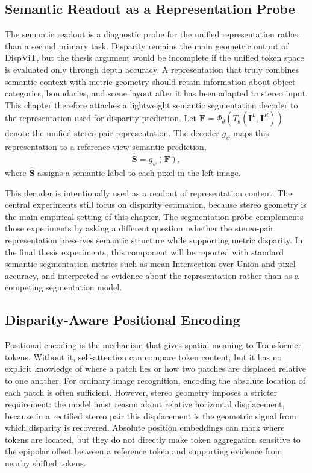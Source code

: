 \subsection{Semantic Readout as a Representation Probe}
\label{sec:dispvit_semantic_readout}
The semantic readout is a diagnostic probe for the unified representation rather than a second primary task.
Disparity remains the main geometric output of DispViT, but the thesis argument would be incomplete if the unified token space is evaluated only through depth accuracy.
A representation that truly combines semantic context with metric geometry should retain information about object categories, boundaries, and scene layout after it has been adapted to stereo input.
This chapter therefore attaches a lightweight semantic segmentation decoder to the representation used for disparity prediction.
Let $\bm{F}=\Phi_{\theta}(T_{\theta}(\bm{I}^L,\bm{I}^R))$ denote the unified stereo-pair representation.
The decoder $g_{\psi}$ maps this representation to a reference-view semantic prediction,
\begin{equation}
    \hat{\bm{S}} = g_{\psi}(\bm{F}),
    \label{eq:dispvit_semantic_readout}
\end{equation}
where $\hat{\bm{S}}$ assigns a semantic label to each pixel in the left image.

This decoder is intentionally used as a readout of representation content.
The central experiments still focus on disparity estimation, because stereo geometry is the main empirical setting of this chapter.
The segmentation probe complements those experiments by asking a different question: whether the stereo-pair representation preserves semantic structure while supporting metric disparity.
In the final thesis experiments, this component will be reported with standard semantic segmentation metrics such as mean Intersection-over-Union and pixel accuracy, and interpreted as evidence about the representation rather than as a competing segmentation model.

\subsection{Disparity-Aware Positional Encoding}
Positional encoding is the mechanism that gives spatial meaning to Transformer tokens.
Without it, self-attention can compare token content, but it has no explicit knowledge of where a patch lies or how two patches are displaced relative to one another.
For ordinary image recognition, encoding the absolute location of each patch is often sufficient.
However, stereo geometry imposes a stricter requirement: the model must reason about relative horizontal displacement, because in a rectified stereo pair this displacement is the geometric signal from which disparity is recovered.
Absolute position embeddings can mark where tokens are located, but they do not directly make token aggregation sensitive to the epipolar offset between a reference token and supporting evidence from nearby shifted tokens.

